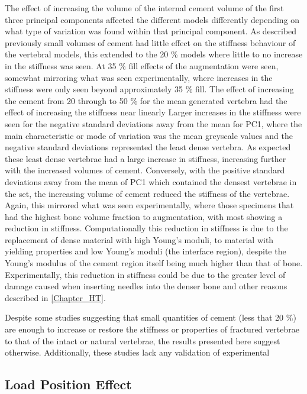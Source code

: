 The effect of increasing the volume of the internal cement volume of the first
three principal components affected the different models differently depending
on what type of variation was found within that principal component.  As
described previously small volumes of cement had little effect on the stiffness
behaviour of the vertebral models, this extended to the 20 \% models where
little to no increase in the stiffness was seen.  At 35 \% fill effects of the
augmentation were seen, somewhat mirroring what was seen experimentally, where
increases in the stiffness were only seen beyond approximately 35 \% fill.  The
effect of increasing the cement from 20 through to 50 \% for the mean generated
vertebra had the effect of increasing the stiffness near linearly %
Larger increases in the stiffness were seen for the negative standard
deviations away from the mean for PC1, where the main characteristic or mode of
variation was the mean greyscale values and the negative standard deviations
represented the least dense vertebra.  As expected these least dense vertebrae
had a large increase in stiffness, increasing further with the increased
volumes of cement.  Conversely, with the positive standard deviations away from
the mean of PC1 which contained the densest vertebrae in the set, the
increasing volume of cement reduced the stiffness of the vertebrae.  Again,
this mirrored what was seen experimentally, where those specimens that had the
highest bone volume fraction %
to augmentation, with most showing a reduction in stiffness.  Computationally
this reduction in stiffness is due to the replacement of dense material with
high Young's moduli, to material with yielding properties and low Young's
moduli (the interface region), despite the Young's modulus of the cement region
itself being much higher than that of bone.  Experimentally, this reduction in
stiffness could be due to the greater level of damage caused when inserting
needles into the denser bone and other reasons described in \cref{Chapter_HT}.

Despite some studies suggesting that small quantities of cement (less that 20
\%) are enough to increase or restore the stiffness or properties of fractured
vertebrae to that of the intact or natural vertebrae, the results presented
here suggest otherwise.  Additionally, these studies lack any validation of
experimental 


\subsection{Load Position Effect}

